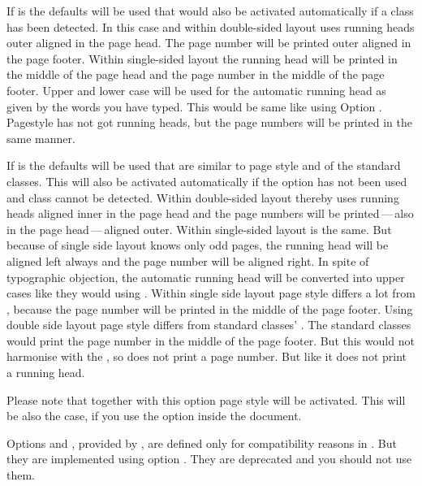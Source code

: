 If  is  the defaults will be used that
would also be activated automatically if a \KOMAScript{} class has been
detected. In this case and within double-sided layout 
uses running heads outer aligned in the page head. The page number will be
printed outer aligned in the page footer. Within single-sided layout the
running head will be printed in the middle of the page head and the page
number in the middle of the page footer. Upper and lower case will be used for
the automatic running head as given by the words you have typed. This would be
same like using Option
. Pagestyle
 has not got running heads, but the page numbers
will be printed in the same manner.

If  is  the defaults will be used that are
similar to page style  and  of the
standard classes. This  will also be activated automatically
if the option has not been used and \KOMAScript{} class cannot be
detected. Within double-sided layout thereby  uses
running heads aligned inner in the page head and the page numbers will be
printed\,---\,also in the page head\,---\,aligned outer. Within single-sided
layout  is the same. But because of single side layout
knows only odd pages, the running head will be aligned left always and the
page number will be aligned right. In spite of typographic objection, the
automatic running head will be converted into upper cases like they would
using . Within
single side layout page style  differs a lot from
, because the page number will be printed in the middle
of the page footer. Using double side layout page style
 differs from standard classes'
. The standard classes would print the page number in the
middle of the page footer. But this would not harmonise with the
, so  does not print a page
number. But like  it does not print a running head.

Please note that together with this option page style
 will be activated. This will be also the case, if you
use the option inside the document.

%
%
Options  and , provided by
, are defined only for compatibility reasons in
. But they are implemented using option
. They are deprecated and you should not use them.%
%
%
%
%
%


